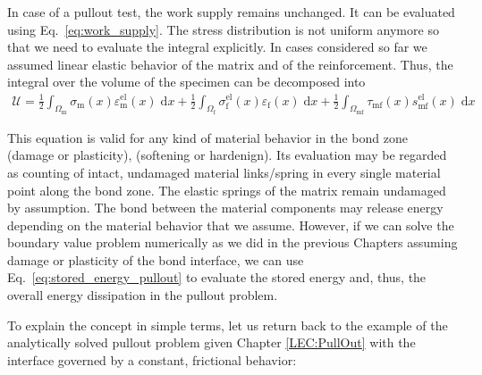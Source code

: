 \documentclass[main.tex]{subfiles}
\begin{document}
In case of a pullout test, the work supply remains unchanged. It can be evaluated using Eq.~\ref{eq:work_supply}.
The stress distribution is not uniform anymore so that we need to evaluate the integral explicitly.
In cases considered so far we assumed linear elastic behavior of the matrix and of the reinforcement.
Thus, the integral over the volume of the specimen can be decomposed into
\begin{align}
    \label{eq:stored_energy_pullout}
\mathcal{U}
=
\frac{1}{2}
\int_{\Omega_\mathrm{m}}
\sigma_\mathrm{m}(x)
\varepsilon^\mathrm{el}_\mathrm{m}(x)
\;
\mathrm{d}x
+
\frac{1}{2}
\int_{\Omega_\mathrm{f}}
\sigma^\mathrm{el}_\mathrm{f}(x)
\varepsilon_\mathrm{f}(x)
\;
\mathrm{d}x
+
\frac{1}{2}
\int_{\Omega_\mathrm{mf}}
\tau_\mathrm{mf}(x)
s^\mathrm{el}_\mathrm{mf}(x)
\;
\mathrm{d}x
\end{align}

This equation is valid for any kind of material behavior in the bond zone (damage or plasticity), (softening or hardenign). 
Its evaluation may be regarded as counting of intact, undamaged material links/spring in every single
material point along the bond zone. The elastic springs of the matrix remain undamaged by assumption. The bond between
the material components may release energy depending on the material behavior that we assume.
However, if we can solve the boundary value problem numerically as we did in the previous 
Chapters assuming damage or plasticity of the bond interface, we can use Eq.~\ref{eq:stored_energy_pullout}
to evaluate the stored energy and, thus, the overall energy dissipation in the pullout problem.


To explain the concept in simple terms, let us return back to the example of the analytically solved
pullout problem given Chapter \ref{LEC:PullOut} with the interface governed by a constant, frictional behavior:


\end{document}
